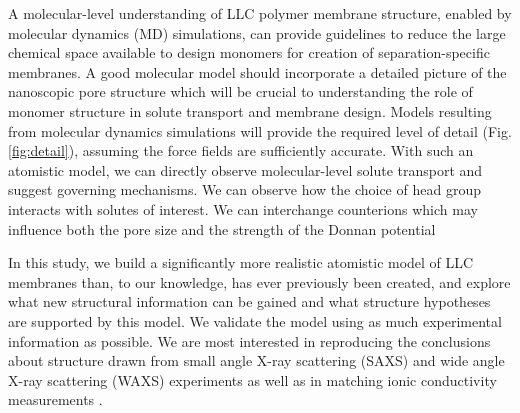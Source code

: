 \documentclass[journal=jpcbfk,manusciprt=article]{achemso}
\begin{document}
  A molecular-level understanding of LLC polymer membrane structure, enabled by
  molecular dynamics (MD) simulations, can provide guidelines to reduce the large
  chemical space available to design monomers for creation of separation-specific
  membranes. A good molecular model should incorporate a detailed picture of the
  nanoscopic pore structure which will be crucial to understanding the role of
  monomer structure in solute transport and membrane design. Models resulting
  from molecular dynamics simulations will provide the required level of detail
  (Fig. \ref{fig:detail}), assuming the force fields are sufficiently accurate.
  With such an atomistic model, we can directly observe molecular-level solute
  transport and suggest governing mechanisms. We can observe how the choice of
  head group interacts with solutes of interest. We can interchange
  counterions which may influence both the pore size and the strength of the
  Donnan potential 


  In this study, we build a significantly more realistic atomistic model of LLC
  membranes than, to our knowledge, has ever previously been created, and explore
  what new structural information can be gained and what structure hypotheses are
  supported by this model. We validate the model using as much experimental
  information as possible. We are most interested in reproducing the conclusions
  about structure drawn from small angle X-ray scattering (SAXS)
  and wide angle X-ray scattering (WAXS) experiments as well as in matching ionic
  conductivity measurements \cite{feng_thin_2016}.
\end{document}
